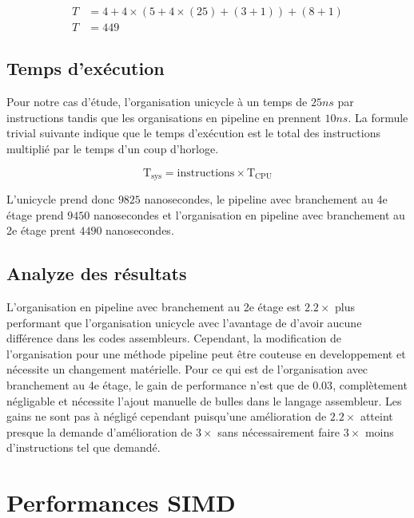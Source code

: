 \documentclass[a11paper]{article}
\newcommand{\todo}[1]{\begin{color}{Red}\textbf{TODO:} #1\end{color}}
\begin{document}
\begin{align}
  T &= 4+ 4\times(5+4\times(25)+(3+1)) + (8+1) \\
  T &= 449
\end{align}

\subsection{Temps d'exécution}


Pour notre cas d'étude, l'organisation unicycle à un temps de $25ns$ par
instructions tandis que les organisations en pipeline en prennent $10ns$. La
formule trivial suivante indique que le temps d'exécution est le total des
instructions multiplié par le temps d'un coup d'horloge.

\begin{equation}
\text{T}_{\text{sys}} = \text{instructions}\times\text{T}_{\text{CPU}}
\end{equation}

L'unicycle prend donc $9825$ nanosecondes, le pipeline avec branchement au 4e
étage prend $9450$ nanosecondes et l'organisation en pipeline avec
branchement au 2e étage prent $4490$ nanosecondes.

\subsection{Analyze des résultats}

L'organisation en pipeline avec branchement au 2e étage est $2.2\times$ plus
performant que l'organisation unicycle avec l'avantage de d'avoir aucune
différence dans les codes assembleurs. Cependant, la modification de
l'organisation pour une méthode pipeline peut être couteuse en developpement
et nécessite un changement matérielle. Pour ce qui est de l'organisation avec
branchement au 4e étage, le gain de performance n'est que de $0.03$,
complètement négligable et nécessite l'ajout manuelle de bulles dans le
langage assembleur. Les gains ne sont pas à négligé cependant puisqu'une
amélioration de $2.2\times$ atteint presque la demande d'amélioration de
$3\times$ sans nécessairement faire $3\times$ moins d'instructions tel que
demandé.


\section{Performances SIMD}
\end{document}
